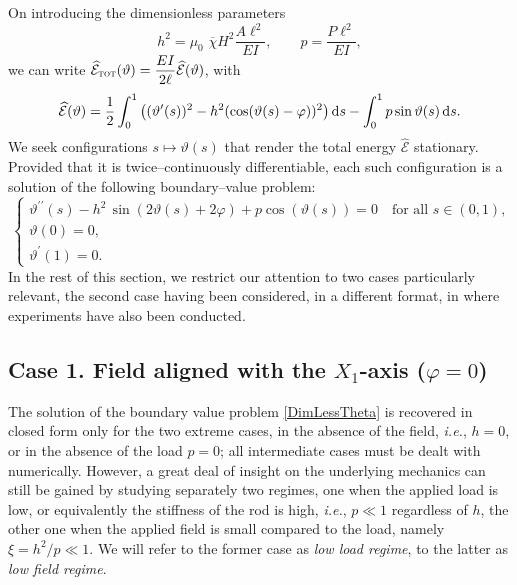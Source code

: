 \documentclass[oneside]{article}
\begin{document}
			On introducing the dimensionless parameters
			\begin{equation}
			h^2 = \mu_0\, \, \overline{\chi}H^2\dfrac{A\ell^2}{EI},\qquad p = \dfrac{P\ell^2}{E I},
			\end{equation}
			we can write $\widehat{\mathcal E}_{\textsc{tot}}(\vartheta)=\dfrac{E I}{2\ell} \widehat{\mathcal E}(\vartheta)$, with 
			\begin{equation}
			\widehat{\mathcal E}(\vartheta)=\frac 12 \int_0^1 \left((\vartheta^\prime(s))^2-h^2(\cos(\vartheta(s)-\varphi))^2\right) \text ds- \int_0^1
			p\sin\vartheta(s)\,\text ds. 
			\label{RobArm_energy}
			\end{equation}
			We seek configurations $s\mapsto\vartheta(s)$ that render the total energy $\widehat{\mathcal E}$ stationary. Provided that it is twice--continuously differentiable, each such configuration is a solution of the following boundary--value problem:
			\begin{equation}\
			\begin{cases}
			\vartheta^{\prime\prime}(s) - h^2 \,\sin(2\vartheta(s)+2\varphi) + p\cos(\vartheta(s))=0\quad \text{for all }s\in(0,1),
			\\\vartheta(0)=0,
			\\\vartheta^\prime(1)=0.
			\label{DimLessTheta}
			\end{cases}
			\end{equation}
			In the rest of this section, we restrict our attention to two cases particularly relevant, the second case having been considered, in a  different format, in \cite{Stanier2016} where experiments have also been conducted.
			
			\subsection*{Case 1. Field aligned with the $X_1$-axis ($\varphi=0$)}
			
			The solution of the boundary value problem \eqref{DimLessTheta} is recovered in closed form only for the two extreme cases, in the absence of the field, \textit{i.e.}, $h=0$, or in the absence of the load $p=0$; all intermediate cases must be dealt with numerically.
			However, a great deal of insight on the underlying mechanics can still be gained by studying separately two regimes, one when the applied load is low, or equivalently the stiffness of the rod is high, \textit{i.e.}, $p\ll 1$ regardless of $h$, the other one when the applied field is small compared to the load, namely $\xi=h^2/p\ll 1$. We will refer to the former case as \emph{low load regime}, to the latter as \emph{low field regime}.
			
\end{document}
